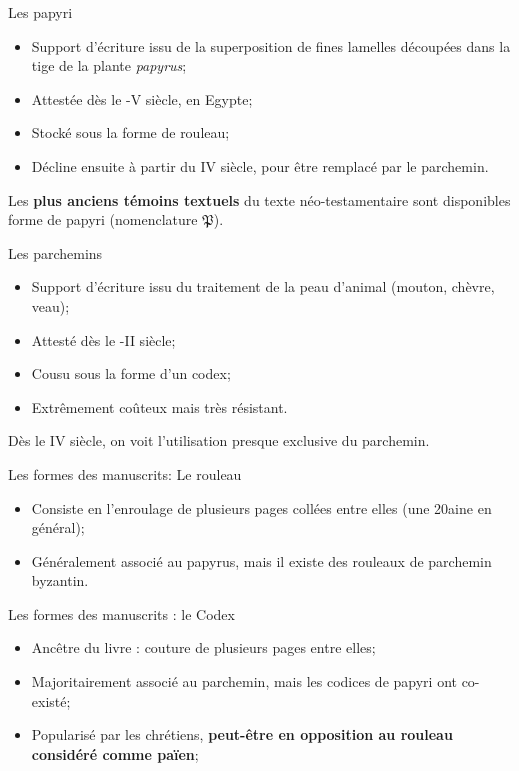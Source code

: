 \documentclass[11pt]{beamer}
\begin{document}
\begin{frame}{Les papyri}
    \begin{itemize}
        \item Support d'écriture issu de la superposition de fines lamelles découpées dans la tige de la plante \emph{papyrus};
        \item Attestée dès le -V\ieme{} siècle, en Egypte;
        \item Stocké sous la forme de rouleau;
        \item Décline ensuite à partir du IV\ieme{} siècle, pour être remplacé par le parchemin.
    \end{itemize}
    \begin{alertblock}{}
        Les \textbf{plus anciens témoins textuels} du texte néo-testamentaire sont disponibles forme de papyri (nomenclature $\mathfrak{P}$).
    \end{alertblock}
\end{frame}

\begin{frame}{Les parchemins}
    \begin{itemize}
        \item Support d'écriture issu du traitement de la peau d'animal (mouton, chèvre, veau);
        \item Attesté dès le -II\ieme{} siècle;
        \item Cousu sous la forme d'un codex;
        \item Extrêmement coûteux mais très résistant.
    \end{itemize}

    \begin{alertblock}{}
        Dès le IV\ieme{} siècle, on voit l'utilisation presque exclusive du parchemin.
    \end{alertblock}
\end{frame}

\begin{frame}{Les formes des manuscrits: Le rouleau}
    \begin{itemize}
        \item Consiste en l'enroulage de plusieurs pages collées entre elles (une 20aine en général);
        \item Généralement associé au papyrus, mais il existe des rouleaux de parchemin byzantin.
    \end{itemize}
\end{frame}

\begin{frame}{Les formes des manuscrits : le Codex}
    \begin{itemize}
        \item Ancêtre du livre : couture de plusieurs pages entre elles;
        \item Majoritairement associé au parchemin, mais les codices de papyri ont co-existé;
        \item Popularisé par les chrétiens, \textbf{peut-être en opposition au rouleau considéré comme païen};
    \end{itemize}
\end{frame}
\end{document}
